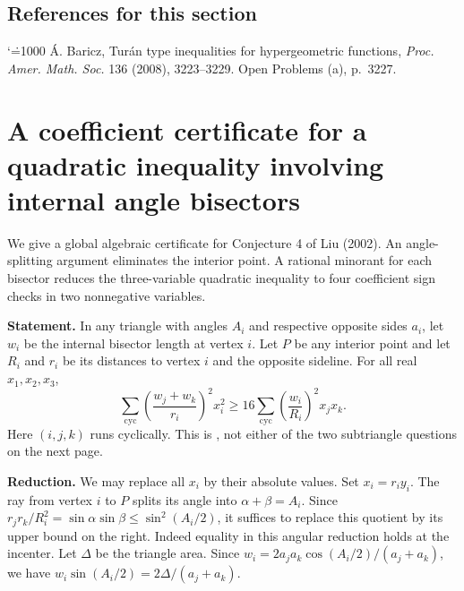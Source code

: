 \documentclass[11pt,a4paper]{article}
\makeatletter
\numberwithin{equation}{section}
\theoremstyle{definition}
\theoremstyle{remark}
\newenvironment{sectionabstract}{\par\smallskip\begingroup\small\noindent}{\par\endgroup\medskip}
\renewenvironment{thebibliography}[1]
 {\subsection*{References for this section}\small
  \list{\@biblabel{\@arabic\c@enumiv}}
       {\settowidth\labelwidth{\@biblabel{#1}}\leftmargin\labelwidth
        \advance\leftmargin\labelsep\@openbib@code
        \usecounter{enumiv}\let\p@enumiv\@empty
        \renewcommand\theenumiv{\@arabic\c@enumiv}}
  \sloppy\clubpenalty4000\widowpenalty4000\sfcode`\.=1000\relax}
 {\def\@noitemerr{\@latex@warning{Empty bibliography}}\endlist}
\makeatother
\begin{document}
\begin{thebibliography}{9}
 \'A. Baricz, Tur\'an type inequalities for hypergeometric functions, \emph{Proc. Amer. Math. Soc.} 136 (2008), 3223--3229. Open Problems (a), p.~3227.
\end{thebibliography}

\par\endgroup

\begingroup
\newcommand{\cy}{\sum_{\mathrm{cyc}}}
\section{\texorpdfstring{A coefficient certificate for a quadratic inequality involving internal angle bisectors}{A coefficient certificate for a quadratic inequality involving internal angle bisectors}}\label{section:r43keio}
\par\medskip


\begin{sectionabstract}
We give a global algebraic certificate for Conjecture 4 of Liu (2002). An angle-splitting argument eliminates the interior point. A rational minorant for each bisector reduces the three-variable quadratic inequality to four coefficient sign checks in two nonnegative variables.
\end{sectionabstract}
\textbf{Statement.} In any triangle with angles $A_i$ and respective opposite sides $a_i$, let $w_i$ be the internal bisector length at vertex $i$. Let $P$ be any interior point and let $R_i$ and $r_i$ be its distances to vertex $i$ and the opposite sideline. For all real $x_1,x_2,x_3$,
\[
 \cy \left(\frac{w_j+w_k}{r_i}\right)^2 x_i^2\ge
 16\cy \left(\frac{w_i}{R_i}\right)^2 x_jx_k. \tag{1}
\]
Here $(i,j,k)$ runs cyclically. This is \cite[Conjecture 4, (38)]{r43keio:liu}, not either of the two subtriangle questions on the next page.

\textbf{Reduction.} We may replace all $x_i$ by their absolute values. Set $x_i=r_i y_i$. The ray from vertex $i$ to $P$ splits its angle into $\alpha+\beta=A_i$. Since $r_jr_k/R_i^2=\sin\alpha\sin\beta\le\sin^2(A_i/2)$, it suffices to replace this quotient by its upper bound on the right. Indeed equality in this angular reduction holds at the incenter. Let $\Delta$ be the triangle area. Since $w_i=2a_ja_k\cos(A_i/2)/(a_j+a_k)$, we have $w_i\sin(A_i/2)=2\Delta/(a_j+a_k)$.
\end{document}
